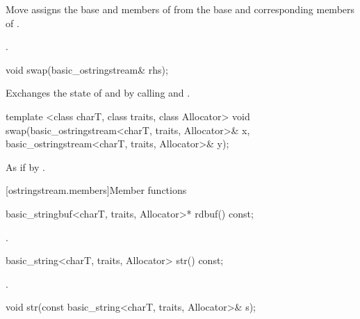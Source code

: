 \begin{itemdescr}
\pnum
\effects Move assigns the base and members of  from the base and corresponding
members of .

\pnum
\returns {}.
\end{itemdescr}

%
\begin{itemdecl}
void swap(basic_ostringstream& rhs);
\end{itemdecl}

\begin{itemdescr}
\pnum
\effects Exchanges the state of  and
 by calling
 and
.
\end{itemdescr}


%
\begin{itemdecl}
template <class charT, class traits, class Allocator>
  void swap(basic_ostringstream<charT, traits, Allocator>& x,
            basic_ostringstream<charT, traits, Allocator>& y);
\end{itemdecl}

\begin{itemdescr}
\pnum
\effects As if by .
\end{itemdescr}

[ostringstream.members]{Member functions}

%
\begin{itemdecl}
basic_stringbuf<charT, traits, Allocator>* rdbuf() const;
\end{itemdecl}

\begin{itemdescr}
\pnum
\returns
{}.
\end{itemdescr}

%
\begin{itemdecl}
basic_string<charT, traits, Allocator> str() const;
\end{itemdecl}

\begin{itemdescr}
\pnum
\returns
{}.
\end{itemdescr}

%
\begin{itemdecl}
void str(const basic_string<charT, traits, Allocator>& s);
\end{itemdecl}

